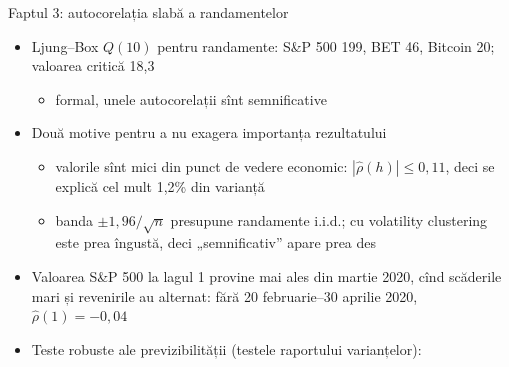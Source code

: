 \begin{frame}{Faptul 3: autocorelația slabă a randamentelor}
\itemsize{\small}
\begin{itemize}
    \item Ljung--Box $Q(10)$ pentru randamente: S\&P 500 199, BET 46, Bitcoin 20; valoarea critică 18{,}3
    \begin{itemize}
        \item formal, unele autocorelații sînt semnificative
    \end{itemize}
    \item Două motive pentru a nu exagera importanța rezultatului
    \begin{itemize}
        \item valorile sînt mici din punct de vedere economic: $|\hat\rho(h)| \le 0{,}11$, deci se explică cel mult 1{,}2\% din varianță
        \item banda $\pm 1{,}96/\sqrt{n}$ presupune randamente i.i.d.; cu volatility clustering este prea îngustă, deci „semnificativ” apare prea des
    \end{itemize}
    \item Valoarea S\&P 500 la lagul 1 provine mai ales din martie 2020, cînd scăderile mari și revenirile au alternat: fără 20 februarie--30 aprilie 2020, $\hat\rho(1) = -0{,}04$
    \item Teste robuste ale previzibilității (testele raportului varianțelor): 
\end{itemize}
\end{frame}

